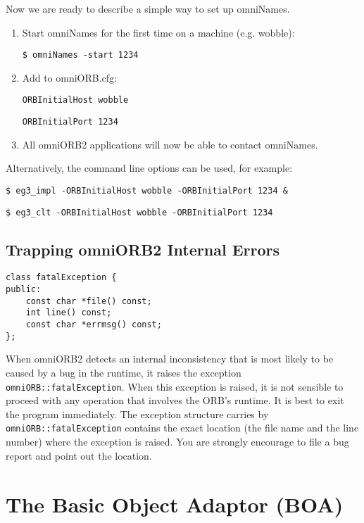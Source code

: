 \documentclass[11pt,twoside,onecolumn]{book}
\begin{document}
Now we are ready to describe a simple way to set up omniNames.

\begin{enumerate}
\item Start omniNames for the first time on a machine (e.g. wobble):

{\tt \$ omniNames -start 1234}

\item Add to omniORB.cfg:

{\tt ORBInitialHost wobble}

{\tt ORBInitialPort 1234}

\item All omniORB2 applications will now be able to contact omniNames.

\end{enumerate}

Alternatively, the command line options can be used, for example:

{\tt \$ eg3\_impl -ORBInitialHost wobble -ORBInitialPort 1234 \&}

{\tt \$ eg3\_clt -ORBInitialHost wobble -ORBInitialPort 1234}


\section{Trapping omniORB2 Internal Errors}

{\small
\begin{verbatim}
class fatalException {
public:
    const char *file() const;
    int line() const;
    const char *errmsg() const;
};
\end{verbatim}
}

When omniORB2 detects an internal inconsistency that is most likely to be
caused by a bug in the runtime, it raises the exception {\tt
omniORB::fatalException}.  When this exception is raised, it is not
sensible to proceed with any operation that involves the ORB's runtime. It
is best to exit the program immediately. The exception structure carries by
{\tt omniORB::fatalException} contains the exact location (the file name
and the line number) where the exception is raised. You are strongly
encourage to file a bug report and point out the location.


\chapter{The Basic Object Adaptor (BOA)}
\end{document}
